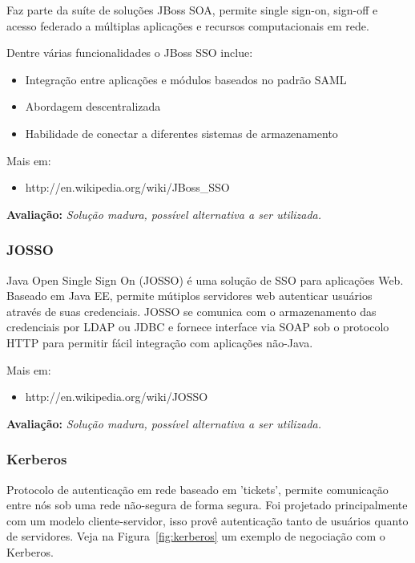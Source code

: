 \documentclass[11pt]{article}
\begin{document}
Faz parte da suíte de soluções JBoss SOA, permite single sign-on, sign-off e
acesso federado a múltiplas aplicações e recursos computacionais em rede.

Dentre várias funcionalidades o JBoss SSO inclue:

\begin{itemize}
  \item{Integração entre aplicações e módulos baseados no padrão SAML}
  \item{Abordagem descentralizada}
  \item{Habilidade de conectar a diferentes sistemas de armazenamento}
\end{itemize}

Mais em:
\begin{itemize}
  \item{http://en.wikipedia.org/wiki/JBoss\_SSO}
\end{itemize}

{\bf Avaliação:} {\it Solução madura, possível alternativa a ser utilizada.}

\subsubsection{JOSSO}

Java Open Single Sign On (JOSSO) é uma solução de SSO para aplicações Web.
Baseado em Java EE, permite mútiplos servidores web autenticar
usuários através de suas credenciais. JOSSO se comunica com o armazenamento das
credenciais por LDAP ou JDBC e fornece interface via SOAP sob o protocolo HTTP
para permitir fácil integração com aplicações não-Java.

Mais em:
\begin{itemize}
  \item{http://en.wikipedia.org/wiki/JOSSO}
\end{itemize}

{\bf Avaliação:} {\it Solução madura, possível alternativa a ser utilizada.}

\subsubsection{Kerberos}

Protocolo de autenticação em rede baseado em 'tickets', permite comunicação
entre nós sob uma rede não-segura de forma segura. Foi projetado
principalmente com um modelo cliente-servidor, isso provê autenticação tanto
de usuários quanto de servidores. Veja na Figura~\ref{fig:kerberos} um exemplo
de negociação com o Kerberos.
\end{document}
